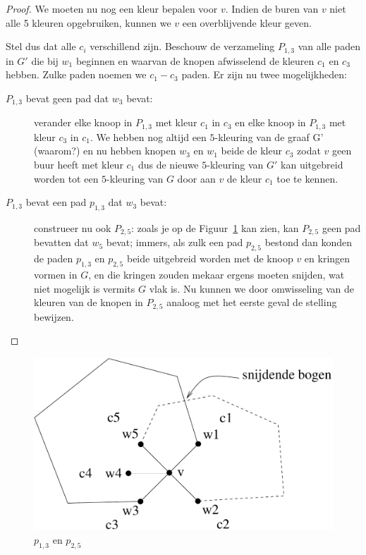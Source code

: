 \begin{proof}
We moeten nu nog een kleur bepalen voor $v$. Indien de buren van $v$ niet
alle 5 kleuren opgebruiken, kunnen we $v$ een overblijvende kleur geven.

Stel dus dat alle $c_{i}$ verschillend zijn. Beschouw de verzameling
$P_{1,3}$ van alle paden in $G'$ die bij $w_{1}$ beginnen en waarvan de
knopen afwisselend de kleuren $c_{1}$ en $c_{3}$ hebben. Zulke paden
noemen we $c_{1}-c_{3}$ paden.  Er zijn nu twee mogelijkheden:

\begin{description}
\item[$P_{1,3}$ bevat geen pad dat $w_{3}$ bevat:] verander elke
  knoop in $P_{1,3}$ met kleur $c_{1}$ in $c_{3}$ en elke knoop in
  $P_{1,3}$ met kleur $c_{3}$ in $c_{1}$. We hebben nog altijd een
  $5$-kleuring van de graaf G' (waarom?) en nu hebben knopen $w_{3}$ en
  $w_{1}$ beide de kleur $c_{3}$ zodat $v$ geen buur heeft met kleur
  $c_{1}$ dus de nieuwe $5$-kleuring van $G'$ kan uitgebreid worden tot
  een $5$-kleuring van $G$ door aan $v$ de kleur $c_{1}$ toe te kennen.
  
\item[$P_{1,3}$ bevat een pad $p_{1,3}$ dat $w_{3}$ bevat:] construeer
  nu ook $P_{2,5}$: zoals je op de Figuur~\ref{5kleuring3} kan zien,
  kan $P_{2,5}$ geen pad bevatten dat $w_{5}$ bevat; immers, als zulk
  een pad $p_{2,5}$ bestond dan konden de paden $p_{1,3}$ en $p_{2,5}$
  beide uitgebreid worden met de knoop $v$ en kringen vormen in $G$, en
  die kringen zouden mekaar ergens moeten snijden, wat niet mogelijk
  is vermits $G$ vlak is. Nu kunnen we door omwisseling van de kleuren
  van de knopen in $P_{2,5}$ analoog met het eerste geval de stelling
  bewijzen.
\end{description}
\end{proof}

\begin{figure}[ht]
\begin{center}
\includegraphics[width=0.4\linewidth,keepaspectratio]{5kleuring3}
\end{center}
\caption{$p_{1,3}$ en $p_{2,5}$ \label{5kleuring3}}
\end{figure}

